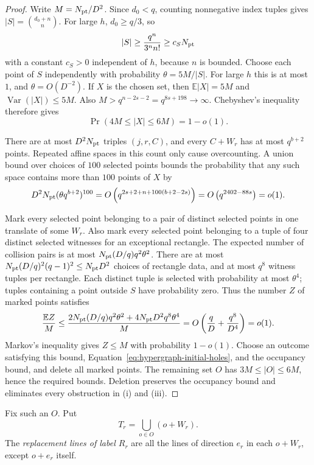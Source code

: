 \begin{proof}
Write $M=N_{\rm pt}/D^2$.  Since $d_0<q$, counting nonnegative index
tuples gives $|S|=\binom{d_0+n}{n}$.  For large $h$, $d_0\ge q/3$,
so
\[
 |S|\ge \frac{q^n}{3^n n!}\ge c_S N_{\rm pt}
\]
with a constant $c_S>0$ independent of $h$, because $n$ is bounded.
Choose each point of $S$ independently with probability
$\theta=5M/|S|$.  For large $h$ this is at most $1$, and
$\theta=O(D^{-2})$.  If $X$ is the chosen set, then
$\mathbb E|X|=5M$ and $\operatorname{Var}(|X|)\le5M$.
Also $M>q^{n-2s-2}=q^{8s+198}\to\infty$.
Chebyshev's inequality therefore gives
\begin{equation}\label{eq:hypergraph-initial-holes}
 \Pr(4M\le |X|\le6M)=1-o(1).
\end{equation}

There are at most $D^2N_{\rm pt}$ triples $(j,r,C)$, and every
$C+W_r$ has at most $q^{b+2}$ points.  Repeated affine spaces in
this count only cause overcounting.  A union bound over choices of
$100$ selected points bounds the probability that any such space
contains more than $100$ points of $X$ by
\[
 D^2N_{\rm pt}(\theta q^{b+2})^{100}
 =O\left(q^{2s+2+n+100(b+2-2s)}\right)
 =O\left(q^{2402-88s}\right)=o(1).
\]

Mark every selected point belonging to a pair of distinct selected
points in one translate of some $W_r$.  Also mark every selected
point belonging to a tuple of four distinct selected witnesses for
an exceptional rectangle.  The expected number of collision pairs
is at most
$N_{\rm pt}(D/q)q^2\theta^2$.  There are at most
$N_{\rm pt}(D/q)^2(q-1)^2\le N_{\rm pt}D^2$
choices of rectangle data, and at most $q^8$ witness tuples per
rectangle.  Each distinct tuple is selected with probability at most
$\theta^4$; tuples containing a point outside $S$ have probability zero.
Thus the number $Z$ of marked points satisfies
\[
 \frac{\mathbb EZ}{M}
 \le \frac{2N_{\rm pt}(D/q)q^2\theta^2
             +4N_{\rm pt}D^2q^8\theta^4}{M}
 =O\left(\frac qD+\frac{q^8}{D^4}\right)=o(1).
\]
Markov's inequality gives $Z\le M$ with probability $1-o(1)$.
Choose an outcome satisfying this bound, Equation~\eqref{eq:hypergraph-initial-holes},
and the occupancy bound, and delete all marked points.  The remaining
set $O$ has $3M\le |O|\le6M$, hence the required bounds.  Deletion
preserves the occupancy bound and eliminates every obstruction in
\textup{(i)} and \textup{(iii)}.
\end{proof}

Fix such an $O$.  Put
\[
 T_r=\bigcup_{o\in O}(o+W_r).
\]
The \emph{replacement lines of label $R_r$} are all the lines of
direction $e_r$ in each $o+W_r$, except $o+e_r$ itself.

